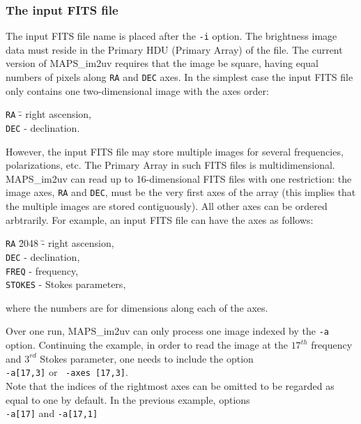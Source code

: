 \documentclass[letterpaper, twoside, 12pt]{article}
\begin{document}
\subsubsection*{The input FITS file}
The input FITS file name is placed after the {\tt-i} option. The brightness image data must reside in the Primary HDU (Primary Array) of the file. The current version of MAPS\_im2uv requires that the image be square, having equal numbers of pixels along {\tt RA} and {\tt DEC} axes. In the simplest case the input FITS 
file only contains one two-dimensional image with the axes order:
\begin{tabbing}
{\tt RA} \hspace{5mm} \= - right ascension,\\
{\tt DEC} \> - declination.
\end{tabbing}
However, the input FITS file may store multiple images for several 
frequencies, polarizations, etc. The Primary Array in such FITS files is 
multidimensional. MAPS\_im2uv can read up to 16-dimensional FITS files with 
one restriction: the image axes, {\tt RA} and {\tt DEC}, must be the very 
first axes of the array (this implies that the multiple images are stored 
contiguously). All other axes can be ordered arbtrarily. For example, an 
input FITS file can have the axes as follows:
\begin{tabbing}
{\tt RA} \hspace{10mm} \=  2048 \hspace{5mm} \= - right ascension,\\
{\tt DEC}  \> - declination,\\
{\tt FREQ}  \> - frequency,\\
{\tt STOKES} \> - Stokes parameters,
\end{tabbing}
where the numbers are for dimensions along each of the axes.

Over one run, MAPS\_im2uv can only process one image indexed by the 
{\tt-a} option. 
Continuing the example, in order to read the image at the $17^{th}$ frequency 
and $3^{rd}$ Stokes parameter, one needs to include the option\\

{\tt -a[17,3]} or \ {\tt -axes [17,3]}. \\

Note that the indices of the rightmost axes can be omitted to be regarded as
equal to one 
by default. In the previous example, options \\

{\tt -a[17]} and {\tt -a[17,1]}\\
\end{document}
